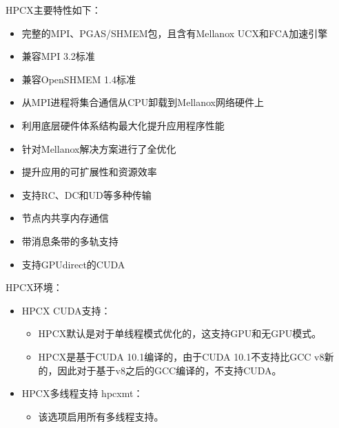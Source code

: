 \documentclass[a4paper,12pt,english]{sphinxmanual}
\begin{document}
\sphinxAtStartPar
HPC\sphinxhyphen{}X主要特性如下：
\begin{itemize}
\item {} 
\sphinxAtStartPar
完整的MPI、PGAS/SHMEM包，且含有Mellanox UCX和FCA加速引擎

\item {} 
\sphinxAtStartPar
兼容MPI 3.2标准

\item {} 
\sphinxAtStartPar
兼容OpenSHMEM 1.4标准

\item {} 
\sphinxAtStartPar
从MPI进程将集合通信从CPU卸载到Mellanox网络硬件上

\item {} 
\sphinxAtStartPar
利用底层硬件体系结构最大化提升应用程序性能

\item {} 
\sphinxAtStartPar
针对Mellanox解决方案进行了全优化

\item {} 
\sphinxAtStartPar
提升应用的可扩展性和资源效率

\item {} 
\sphinxAtStartPar
支持RC、DC和UD等多种传输

\item {} 
\sphinxAtStartPar
节点内共享内存通信

\item {} 
\sphinxAtStartPar
带消息条带的多轨支持

\item {} 
\sphinxAtStartPar
支持GPU\sphinxhyphen{}direct的CUDA

\end{itemize}

\sphinxAtStartPar
HPC\sphinxhyphen{}X环境：
\begin{itemize}
\item {} 
\sphinxAtStartPar
HPC\sphinxhyphen{}X CUDA支持：
\begin{itemize}
\item {} 
\sphinxAtStartPar
HPC\sphinxhyphen{}X默认是对于单线程模式优化的，这支持GPU和无GPU模式。

\item {} 
\sphinxAtStartPar
HPC\sphinxhyphen{}X是基于CUDA 10.1编译的，由于CUDA 10.1不支持比GCC v8新的，因此对于基于v8之后的GCC编译的，不支持CUDA。

\end{itemize}

\item {} 
\sphinxAtStartPar
HPC\sphinxhyphen{}X多线程支持 \sphinxhyphen{} hpcx\sphinxhyphen{}mt：
\begin{itemize}
\item {} 
\sphinxAtStartPar
该选项启用所有多线程支持。

\end{itemize}

\end{itemize}
\end{document}
